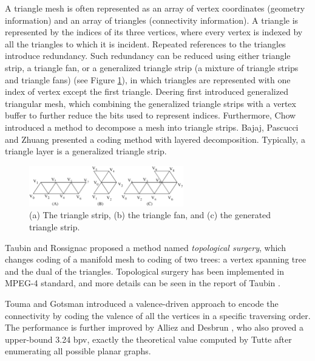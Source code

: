     A triangle mesh is often represented as an array of vertex coordinates
    (geometry information) and an array of triangles (connectivity information). 
    A triangle is represented by the indices of its three vertices,
    where every vertex is indexed by all the
    triangles to which it is incident. Repeated references to the triangles introduce
    redundancy. Such redundancy can be reduced using either 
    triangle strip, a triangle fan, or a
    generalized triangle strip (a mixture of triangle strips and
    triangle fans) (see Figure \ref{strip}), 
    in which triangles are represented with one index of vertex
    except the first triangle. 
    Deering \cite{218391} first introduced generalized triangular mesh, 
    which combining the generalized triangle strips with a vertex buffer
    to further reduce the bits used to represent indices. 
    Furthermore, Chow \cite{267103} introduced a method to
    decompose a mesh into triangle strips. 
    Bajaj, Pascucci and Zhuang \cite{789628} presented a coding method with layered
    decomposition. 
    Typically, a triangle layer is a generalized triangle strip. 
    \begin{figure}[ht]
    \centering
    \includegraphics[width=0.6\textwidth]{strip.eps}
    \caption{(a) The triangle strip, (b) the triangle fan, and (c) the generated triangle strip.}\label{strip}
    \end{figure}

    Taubin and Rossignac \cite{274365} proposed a method named
    \emph{topological surgery}, which changes coding of a manifold
    mesh to coding of two trees: a vertex spanning tree and the dual of the triangles.
    Topological surgery has been implemented in MPEG-4 standard, and more details
    can be seen in the report of Taubin \cite{3d:Taubin}.
    
    Touma and Gotsman \cite{triangle:Touma} introduced a
    valence-driven approach to encode the connectivity by coding the
    valence of all the vertices in a specific traversing order. 
    The performance is further improved
    by Alliez and Desbrun \cite{alliez01valencedriven}, who also proved a
    upper-bound 3.24 bpv, exactly the theoretical value computed
    by Tutte \cite{census:Tutte} after enumerating all possible planar
    graphs.


